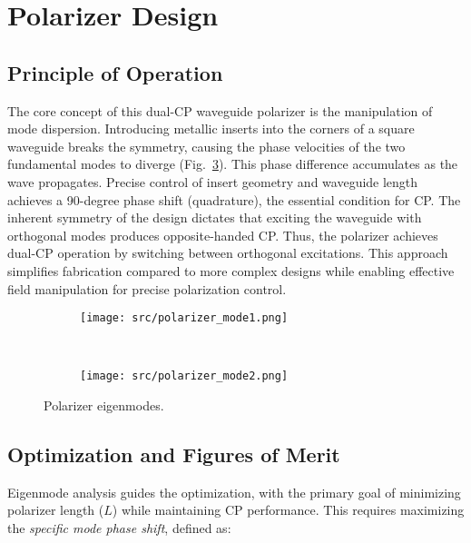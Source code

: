 \documentclass[conference,a4paper]{isap2025}
\begin{document}

\section{Polarizer Design}

\subsection{Principle of Operation}
The core concept of this dual-CP waveguide polarizer is the manipulation of mode dispersion.  Introducing metallic inserts into the corners of a square waveguide breaks the symmetry, causing the phase velocities of the two fundamental modes to diverge (Fig.~\ref{fig:polarizer-modes}).  This phase difference accumulates as the wave propagates.  Precise control of insert geometry and waveguide length achieves a 90-degree phase shift (quadrature), the essential condition for CP. The inherent symmetry of the design dictates that exciting the waveguide with orthogonal modes produces opposite-handed CP.  Thus, the polarizer achieves dual-CP operation by switching between orthogonal excitations. This approach simplifies fabrication compared to more complex designs while enabling effective field manipulation for precise polarization control.

\begin{figure}
    \centering
    \begin{subfigure}{.22\textwidth}
        \centering
        \texttt{[image: src/polarizer\_mode1.png]}
        \caption{}
        \label{fig:polarizer-mode1}
    \end{subfigure}
    ~
    \begin{subfigure}{.22\textwidth}
        \centering
        \texttt{[image: src/polarizer\_mode2.png]}
        \caption{}
        \label{fig:polarizer-mode2}
    \end{subfigure}
    \caption{Polarizer eigenmodes.}
    \label{fig:polarizer-modes}
\end{figure}

\subsection{Optimization and Figures of Merit}
Eigenmode analysis guides the optimization, with the primary goal of minimizing polarizer length ($L$) while maintaining CP performance.  This requires maximizing the \emph{specific mode phase shift}, defined as:
\end{document}
